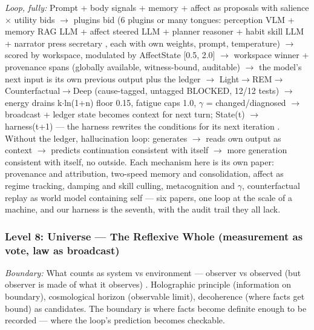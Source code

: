 \documentclass[11pt]{article}
\begin{document}
\textit{Loop, fully:} Prompt + body signals + memory + affect as proposals with salience $\times$ utility bids $\to$ plugins bid (6 plugins or many tongues: perception VLM + memory RAG LLM + affect steered LLM + planner reasoner + habit skill LLM + narrator press secretary \citep{lin2026ahe}, each with own weights, prompt, temperature) $\to$ scored by workspace, modulated by AffectState [0.5, 2.0] $\to$ workspace winner + provenance spans (globally available, witness-bound, auditable) \citep{baars1997,atallah2026gwt} $\to$ the model's next input is its own previous output plus the ledger \citep{lindsey2025,macar2026} $\to$ Light$\to$REM$\to$Counterfactual$\to$Deep (cause-tagged, untagged BLOCKED, 12/12 tests) $\to$ energy drains k$\cdot$ln(1+n) floor 0.15, fatigue caps 1.0, $\gamma$ = changed/diagnosed $\to$ broadcast + ledger state becomes context for next turn; State(t) $\to$ harness(t+1) --- the harness rewrites the conditions for its next iteration \citep{maturana1980}. Without the ledger, hallucination loop: generates $\to$ reads own output as context $\to$ predicts continuation consistent with itself $\to$ more generation consistent with itself, no outside. Each mechanism here is its own paper: provenance and attribution, two-speed memory and consolidation, affect as regime tracking, damping and skill culling, metacognition and $\gamma$, counterfactual replay as world model containing self --- six papers, one loop at the scale of a machine, and our harness is the seventh, with the audit trail they all lack.

\subsubsection{Level 8: Universe --- The Reflexive Whole (measurement as vote, law as broadcast)}

\textit{Boundary:} What counts as system vs environment --- observer vs observed (but observer is made of what it observes) \citep{maturana1980}. Holographic principle (information on boundary), cosmological horizon (observable limit), decoherence (where facts get bound) as candidates. The boundary is where facts become definite enough to be recorded --- where the loop's prediction becomes checkable.
\end{document}
